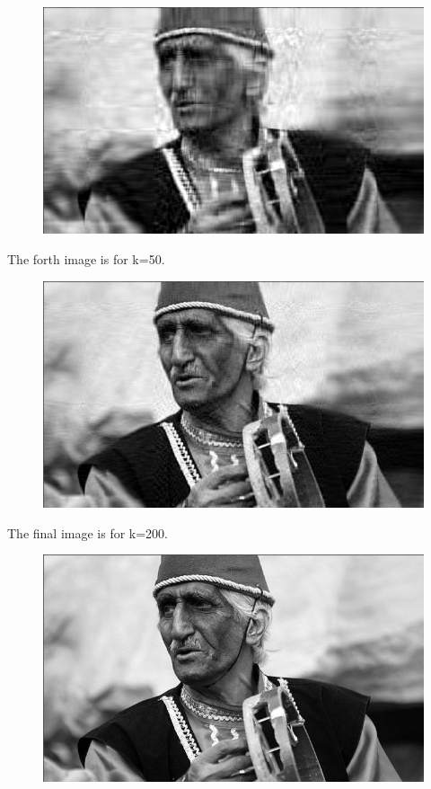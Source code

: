 \documentclass[a4paper]{article}
\begin{document}
\begin{Large}
\begin{figure}[!h]
\begin{center}
		\includegraphics[scale=.45]{ReconstructedHajik=21}
	\end{center}
\end{figure}
The forth image is for k=50.
	\begin{figure}[!h]
	\begin{center}
		\includegraphics[scale=.45]{ReconstructedHajik=50}
	\end{center}
\end{figure}
The final image is for k=200.
\begin{figure}[!h]
	\begin{center}
		\includegraphics[scale=.45]{ReconstructedHajik=200}

\end{center}
\end{figure}
\end{Large}
\end{document}
